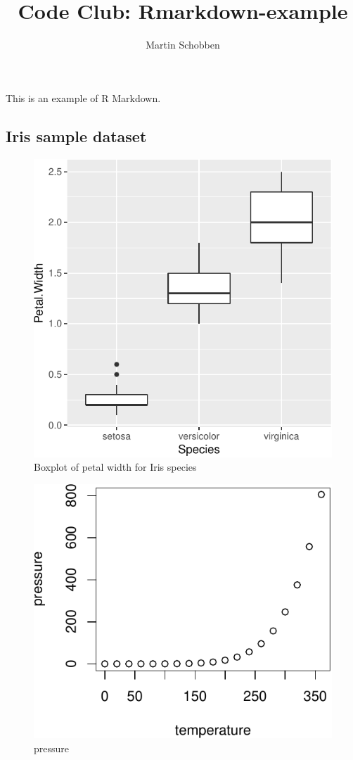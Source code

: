 \documentclass[]{article}
\title{Code Club: Rmarkdown-example}
\author{Martin Schobben}
\date{}
\begin{document}
\maketitle

This is an example of R Markdown.

\subsection{Iris sample dataset}\label{iris-sample-dataset}

\begin{figure}
\centering
\includegraphics{Rmarkdown-example_files/figure-latex/unnamed-chunk-2-1.pdf}
\caption{Boxplot of petal width for Iris species}
\end{figure}

\begin{figure}
\centering
\includegraphics{Rmarkdown-example_files/figure-latex/unnamed-chunk-3-1.pdf}
\caption{pressure}
\end{figure}
\end{document}
